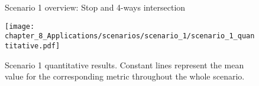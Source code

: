 \begin{comment}
	IDEAS:
	
	1. Con el ADS que hay estable, dejarlo otra vez pulido y optimizado en poco tiempo (creo que YOLO está duplicada, PointPillars no corría bien, etc., y eso se puede poner como GT en el R-VIZ, diciendo específicamente que es GT). 
	
	Eso, con el AD-PerDevKit, estimo que fuesen dos días de trabajo.
	
	2. Ya se hicieron pruebas para meter el by-pass de tracking (hecho en SMARTS/SUMO) en CARLA, y funciona bien, aunque hay que retocar.
	
	3. Mi idea es correr el ADS en las rutas del Leaderboard, y obtener scores, sin nada más que lo estable ahora mismo vs meter predicción + dm con RL sobre todo en intersecciones (las decisiones de la red de rodrigo fuera de intersecciones están capadas)
	
	4. Hacer comparativas múltiples:
	
	ADS sin predicción
	ADS sin predicción, con DM en intersecciones (sólo basado en posición)
	ADS con predicción y DM en intersecciones (basado en predicción)
	
	Y la teoría dice que cuanta más capacidad predictiva metas al sistema, mejores deberían ser las métricas holísticas.
	
	Si todo fuese bien, y hasta la fecha de la lectura, mi idea es ayudar al equipo a meter detección, fusión y tracking en simulación y real, aunque no sean integraciones mid-level, y quitar el by-pass, pero lo anterior es más prioritario.
\end{comment}

\newpage


\begin{figure}[]
	\centering
	\caption{Scenario 1 overview: Stop and 4-ways intersection}
	\label{fig:chapter_8_Applications/scenarios/scenario_1/scenario_1_route22_town03_training}
\end{figure}

\begin{figure}[]
	\centering
	\texttt{[image: chapter\_8\_Applications/scenarios/scenario\_1/scenario\_1\_quantitative.pdf]}
	\captionsetup{justification=justified}
	\caption[Scenario 1 quantitative results]{Scenario 1 quantitative results. Constant lines represent the mean value for the corresponding metric throughout the whole scenario.}
	\label{fig:chapter_8_Applications/scenarios/scenario_1/scenario_1_quantitative}
\end{figure}

